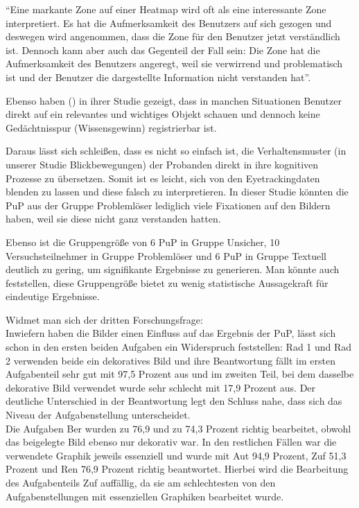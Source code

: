 ``Eine markante Zone auf einer Heatmap wird oft als eine interessante Zone interpretiert. Es hat die Aufmerksamkeit des Benutzers auf sich gezogen und deswegen wird angenommen, dass die Zone für den Benutzer jetzt verständlich ist. Dennoch kann aber auch das Gegenteil der Fall sein: Die Zone hat die Aufmerksamkeit des Benutzers angeregt, weil sie verwirrend und problematisch ist und der Benutzer die dargestellte Information nicht verstanden hat''.

Ebenso haben \citeauthor{hayhoe2005eye} () in ihrer Studie gezeigt, dass in manchen Situationen Benutzer direkt auf ein relevantes und wichtiges Objekt schauen und dennoch keine Gedächtnisspur (Wissensgewinn) registrierbar ist. 

Daraus lässt sich schleißen, dass es nicht so einfach ist, die Verhaltensmuster (in unserer Studie Blickbewegungen) der Probanden direkt in ihre kognitiven Prozesse zu übersetzen. Somit ist es leicht, sich von den Eyetrackingdaten blenden zu lassen und diese falsch zu interpretieren. In dieser Studie könnten die \gls{PuP} aus der Gruppe Problemlöser lediglich viele Fixationen auf den Bildern haben, weil sie diese nicht ganz verstanden hatten. 

Ebenso ist die Gruppengröße von 6 \gls{PuP} in Gruppe Unsicher, 10 Versuchsteilnehmer in Gruppe Problemlöser und 6 \gls{PuP} in Gruppe Textuell deutlich zu gering, um signifikante Ergebnisse zu generieren. Man könnte auch feststellen, diese Gruppengröße bietet zu wenig statistische Aussagekraft für eindeutige Ergebnisse. 

Widmet man sich der dritten Forschungsfrage:\\
Inwiefern haben die Bilder einen Einfluss auf das Ergebnis der \gls{PuP}, lässt sich schon in den ersten beiden Aufgaben ein Widerspruch feststellen: \gls{Rad} 1 und \gls{Rad} 2 verwenden beide ein dekoratives Bild und ihre Beantwortung fällt im ersten Aufgabenteil sehr gut mit 97,5 Prozent aus und im zweiten Teil, bei dem dasselbe dekorative Bild verwendet wurde sehr schlecht mit 17,9 Prozent aus. Der deutliche Unterschied in der Beantwortung legt den Schluss nahe, dass sich das Niveau der Aufgabenstellung unterscheidet.\\
Die Aufgaben \gls{Ber} wurden zu 76,9 und zu 74,3 Prozent richtig bearbeitet, obwohl das beigelegte Bild ebenso nur dekorativ war. In den restlichen Fällen war die verwendete Graphik jeweils essenziell und wurde mit \gls{Aut} 94,9 Prozent, \gls{Zuf} 51,3 Prozent und \gls{Ren} 76,9 Prozent richtig beantwortet. Hierbei wird die Bearbeitung des Aufgabenteils \gls{Zuf} auffällig, da sie am schlechtesten von den Aufgabenstellungen mit essenziellen Graphiken bearbeitet wurde. 


